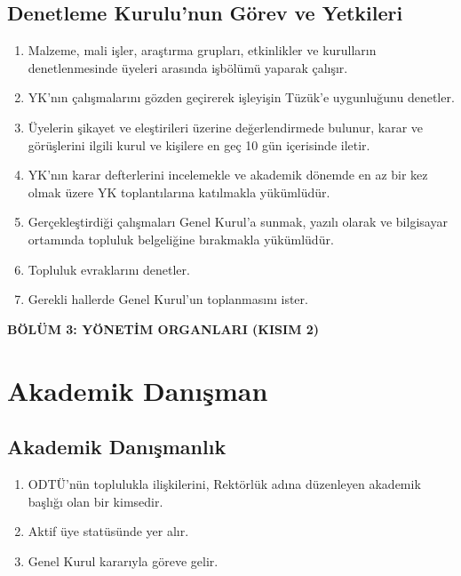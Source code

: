 \documentclass[11pt,a4paper]{article}
\begin{document}
\subsection{Denetleme Kurulu'nun Görev ve Yetkileri}
\begin{enumerate}
    \item Malzeme, mali işler, araştırma grupları, etkinlikler ve kurulların denetlenmesinde üyeleri arasında işbölümü yaparak çalışır.
    \item YK’nın çalışmalarını gözden geçirerek işleyişin Tüzük’e uygunluğunu denetler.
    \item Üyelerin şikayet ve eleştirileri üzerine değerlendirmede bulunur, karar ve görüşlerini ilgili kurul ve kişilere en geç 10 gün içerisinde iletir.
    \item YK’nın karar defterlerini incelemekle ve akademik dönemde en az bir kez olmak üzere YK toplantılarına katılmakla yükümlüdür.
    \item Gerçekleştirdiği çalışmaları Genel Kurul’a sunmak, yazılı olarak ve bilgisayar ortamında topluluk belgeliğine bırakmakla yükümlüdür.
    \item Topluluk evraklarını denetler.
    \item Gerekli hallerde Genel Kurul’un toplanmasını ister.
\end{enumerate}

\begin{center}
    {\Large \textbf{BÖLÜM 3: YÖNETİM ORGANLARI (KISIM 2)}}
\end{center}
\vspace{0.5cm}


\section{Akademik Danışman}

\subsection{Akademik Danışmanlık}
\begin{enumerate}
    \item ODTÜ’nün toplulukla ilişkilerini, Rektörlük adına düzenleyen akademik başlığı olan bir kimsedir.
    \item Aktif üye statüsünde yer alır.
    \item Genel Kurul kararıyla göreve gelir.
\end{enumerate}
\end{document}
